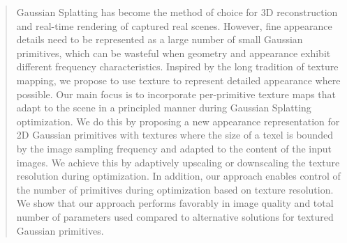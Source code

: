 \documentclass{egpubl}
\begin{document}
\maketitle
\begin{abstract}
Gaussian Splatting has become the method of choice for 3D reconstruction and real-time rendering of captured real scenes.
However, fine appearance details  need to be represented as a large number of small Gaussian primitives, which can be wasteful when geometry and appearance exhibit different frequency characteristics.
Inspired by the long tradition of texture mapping, we propose to use texture to represent detailed appearance where possible.
Our main focus is to incorporate per-primitive texture maps that adapt to the 
scene in a principled manner during Gaussian Splatting optimization.
We do this by proposing a new appearance representation for 2D Gaussian primitives with textures where the size of a texel is bounded by the image sampling frequency and adapted to the content of the input images. 
We achieve this by adaptively upscaling or downscaling the texture resolution during optimization.
In addition,
our approach enables control of the number of primitives during optimization based on texture resolution.
We show that our approach performs favorably in image quality and  total number of parameters used compared to alternative solutions for textured Gaussian primitives.
\end{abstract}








%  
%   
\printbibliography

\end{document}

